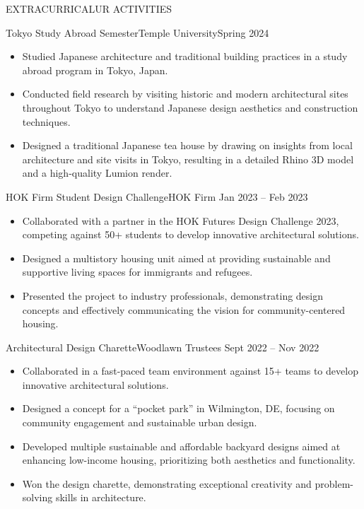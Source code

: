 \documentclass[]{mcdowellcv}
\begin{document}
	\begin{cvsection}{EXTRACURRICALUR ACTIVITIES}

		\begin{cvsubsection}{Tokyo Study Abroad Semester}{Temple University}{Spring 2024}
			\begin{itemize}
				\item Studied Japanese architecture and traditional building practices in a study abroad program in Tokyo, Japan.
				\item Conducted field research by visiting historic and modern architectural sites throughout Tokyo to understand Japanese design aesthetics and construction techniques.
				\item Designed a traditional Japanese tea house by drawing on insights from local architecture and site visits in Tokyo, resulting in a detailed Rhino 3D model and a high-quality Lumion render.
			\end{itemize}
		\end{cvsubsection}

		\begin{cvsubsection}{HOK Firm Student Design Challenge}{HOK Firm}{ Jan 2023 -- Feb 2023}	
			\begin{itemize}
				\item Collaborated with a partner in the HOK Futures Design Challenge 2023, competing against 50+ students to develop innovative architectural solutions.
				\item Designed a multistory housing unit aimed at providing sustainable and supportive living spaces for immigrants and refugees.
				\item Presented the project to industry professionals, demonstrating design concepts and effectively communicating the vision for community-centered housing.
			\end{itemize}
		\end{cvsubsection}

		\begin{cvsubsection}{Architectural Design Charette}{Woodlawn Trustees}{ Sept 2022 -- Nov 2022}	
			\begin{itemize}
				\item Collaborated in a fast-paced team environment against 15+ teams to develop innovative architectural solutions.
				\item Designed a concept for a “pocket park” in Wilmington, DE, focusing on community engagement and sustainable urban design.
				\item Developed multiple sustainable and affordable backyard designs aimed at enhancing low-income housing, prioritizing both aesthetics and functionality.
				\item Won the design charette, demonstrating exceptional creativity and problem-solving skills in architecture.
			\end{itemize}
		\end{cvsubsection}



	\end{cvsection}




	
\end{document}
